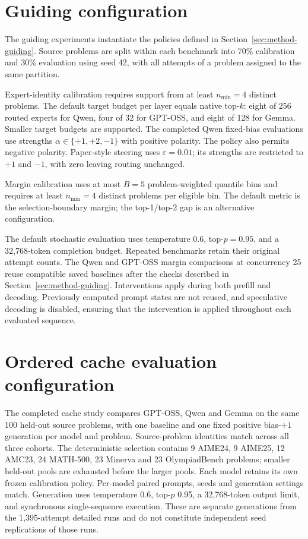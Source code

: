 \documentclass[12pt,a4paper,twoside,openright]{book}
\begin{document}
\section{Guiding configuration}
\label{sec:setup-guiding}

The guiding experiments instantiate the policies defined in
Section~\ref{sec:method-guiding}. Source problems are split within each
benchmark into 70\% calibration and 30\% evaluation using seed 42, with all
attempts of a problem assigned to the same partition.

Expert-identity calibration requires support from at least $n_{\min}=4$
distinct problems. The default target budget per layer equals native
top-$k$: eight of 256 routed experts for Qwen, four of 32 for GPT-OSS, and
eight of 128 for Gemma. Smaller target budgets are supported. The completed
Qwen fixed-bias evaluations use strengths $\alpha\in\{+1,+2,-1\}$ with
positive polarity. The policy also permits negative polarity.
Paper-style steering uses $\varepsilon=0.01$; its strengths are restricted
to $+1$ and $-1$, with zero leaving routing unchanged.

Margin calibration uses at most $B=5$ problem-weighted quantile bins and
requires at least $n_{\min}=4$ distinct problems per eligible bin. The default
metric is the selection-boundary margin; the top-1/top-2 gap is an
alternative configuration.

The default stochastic evaluation uses temperature 0.6, top-$p=0.95$, and a
32,768-token completion budget. Repeated benchmarks retain their original
attempt counts. The Qwen and GPT-OSS margin comparisons at concurrency 25
reuse compatible saved baselines after the checks described in
Section~\ref{sec:method-guiding}. Interventions apply during both prefill and
decoding. Previously computed prompt states are not reused, and speculative
decoding is disabled, ensuring that the intervention is applied throughout
each evaluated sequence.

\section{Ordered cache evaluation configuration}
\label{sec:setup-cache}

The completed cache study compares GPT-OSS, Qwen and Gemma on the same
100 held-out source problems, with one baseline and one fixed positive
bias-$+1$ generation per model and problem. Source-problem identities
match across all three cohorts. The deterministic selection contains
9 AIME24, 9 AIME25, 12 AMC23, 24 MATH-500, 23 Minerva and 23 OlympiadBench
problems; smaller held-out pools are exhausted before the larger pools.
Each model retains its own frozen calibration policy. Per-model paired
prompts, seeds and generation settings match. Generation uses temperature
0.6, top-$p$ 0.95, a 32,768-token output limit, and synchronous
single-sequence execution. These are separate generations from the
1,395-attempt detailed runs and do not constitute independent seed
replications of those runs.
\end{document}
